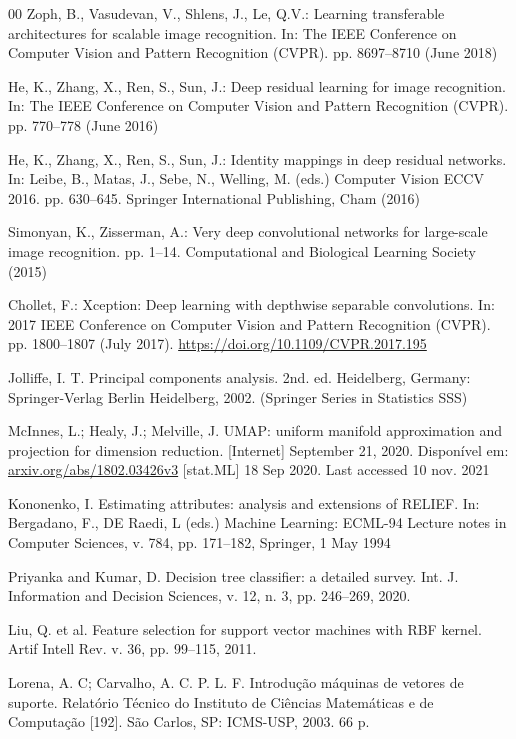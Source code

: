 \documentclass[preprint,12pt]{elsarticle}
\begin{document}
\begin{thebibliography}{00}
Zoph, B., Vasudevan, V., Shlens, J., Le, Q.V.: Learning transferable architectures for scalable image recognition. In: The IEEE Conference on Computer Vision and Pattern Recognition (CVPR). pp. 8697--8710 (June 2018)

He, K., Zhang, X., Ren, S., Sun, J.: Deep residual learning for image recognition. In: The IEEE Conference on Computer Vision and Pattern Recognition (CVPR). pp. 770--778 (June 2016)

He, K., Zhang, X., Ren, S., Sun, J.: Identity mappings in deep residual networks. In: Leibe, B., Matas, J., Sebe, N., Welling, M. (eds.) Computer Vision ECCV 2016. pp. 630--645. Springer International Publishing, Cham (2016)

Simonyan, K., Zisserman, A.: Very deep convolutional networks for large-scale image recognition. pp. 1--14. Computational and Biological Learning Society (2015)

Chollet, F.: Xception: Deep learning with depthwise separable convolutions. In: 2017 IEEE Conference on Computer Vision and Pattern Recognition (CVPR). pp. 1800--1807 (July 2017). \url{https://doi.org/10.1109/CVPR.2017.195}

Jolliffe, I. T. Principal components analysis. 2nd. ed. Heidelberg, Germany: Springer-Verlag Berlin Heidelberg, 2002. (Springer Series in Statistics SSS)

McInnes, L.; Healy, J.; Melville, J. UMAP: uniform manifold approximation and projection for dimension reduction. [Internet] September 21, 2020. Disponível em: \url{arxiv.org/abs/1802.03426v3} [stat.ML] 18 Sep 2020. Last accessed 10 nov. 2021

Kononenko, I. Estimating attributes: analysis and extensions of RELIEF. In: Bergadano, F., DE Raedi, L (eds.) Machine Learning: ECML-94 Lecture notes in Computer Sciences, v. 784, pp. 171--182, Springer, 1 May 1994

Priyanka and Kumar, D. Decision tree classifier: a detailed survey. Int. J. Information and Decision Sciences, v. 12, n. 3, pp. 246--269, 2020.

Liu, Q. et al. Feature selection for support vector machines with RBF kernel. Artif Intell Rev. v. 36, pp. 99--115, 2011.

Lorena, A. C; Carvalho, A. C. P. L. F. Introdução máquinas de vetores de suporte. Relatório Técnico do Instituto de Ciências Matemáticas e de Computação [192]. São Carlos, SP: ICMS-USP, 2003. 66 p.


\end{thebibliography}
\end{document}
